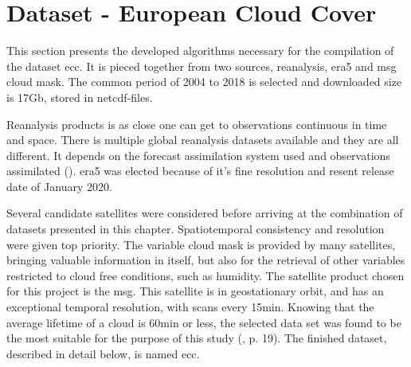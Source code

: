 \section{Dataset - European Cloud Cover }
This section presents the developed algorithms necessary for the compilation of the dataset \acrfull{ecc}. It is pieced together from two sources, reanalysis, \acrshort{era5} and \acrfull{msg} cloud mask. The common period of 2004 to 2018 is selected and downloaded size is 17Gb, stored in \acrshort{netcdf}-files.

Reanalysis products is as close one can get to observations continuous in time and space. There is multiple global reanalysis datasets available and they are all different. It depends on the forecast assimilation system used and observations assimilated (\cite{Fujiwara2017IntroductionSystems}). \acrshort{era5} was elected 
because of it's fine resolution and resent release date of January 2020. %

Several candidate satellites were considered before arriving at the combination of datasets presented in this chapter. Spatiotemporal consistency and resolution were given top priority. The variable cloud mask is provided by many satellites, bringing valuable information in itself, but also for the retrieval of other variables restricted to cloud free conditions, such as humidity. The satellite product chosen for this project is the \acrfull{msg}. This satellite is in geostationary orbit, and has an exceptional temporal resolution, with scans every 15min. Knowing that the average lifetime of a cloud is 60min or less, the selected data set was found to be the most suitable for the purpose of this study (\cite{lohmann2016}, p. 19). The finished dataset, described in detail below, is named \acrfull{ecc}. 

